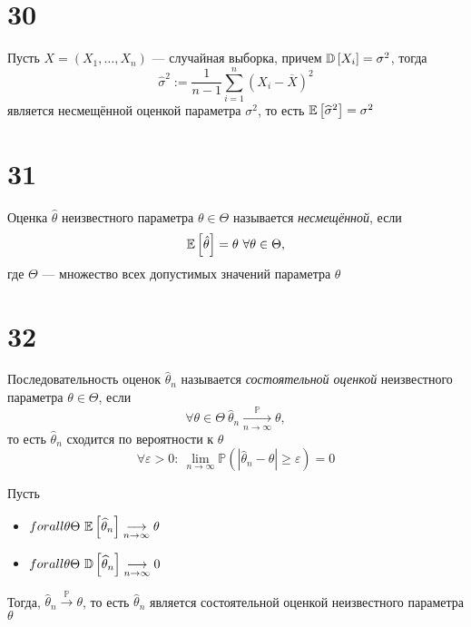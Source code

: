 \documentclass{article}
\begin{document}
\section*{30}
\theorem Пусть $X=(X_1,\ldots,X_n)$ — случайная выборка, причем $\mathbb{D}\left[X_i\right]=\sigma^2$, тогда 
\begin{equation*}
    \widehat{\sigma}^2:=\displaystyle\frac{1}{n-1}\sum_{i=1}^n (X_i-\overline{X})^2
\end{equation*}
является несмещённой оценкой параметра $\sigma^2$, то есть $\mathbb{E}\left[\widehat{\sigma}^2\right]=\sigma^2$

\section*{31}
Оценка $\hat{\theta}$ неизвестного параметра $\theta\in\Theta$ называется \textit{несмещённой}, если 
\begin{equation*}
    \matwait{\hat{\theta}}=\theta\ \forall\theta\in\Theta,
\end{equation*}
где $\Theta$ — множество всех допустимых значений параметра $\theta$

\section*{32}
 Последовательность оценок $\hat{\theta}_n$ называется \textit{состоятельной оценкой} неизвестного параметра $\theta\in\Theta$, если
\begin{equation*}
    \forall \theta\in\Theta\ \hat{\theta}_n\underset{n\to\infty}{\overset{\mathbb{P}}{\longrightarrow}}\theta,
\end{equation*}
то есть $\hat{\theta}_n$ сходится по вероятности к $\theta$
\begin{equation*}
    \forall\varepsilon>0:\ \lim\limits_{n\to\infty}\mathbb{P}(|\hat{\theta}_n-\theta|\geqslant\varepsilon)=0
\end{equation*}


\theorem Пусть 
\begin{itemize}
    \item $forall\theta\Theta\ \matwait{\widehat{\theta}_n}\underset{n\to\infty}{\longrightarrow}\theta$
    \item $forall\theta\Theta\ \dispersia{\widehat{\theta}_n}\underset{n\to\infty}{\longrightarrow}0$
\end{itemize}
Тогда, $\widehat{\theta}_n\overset{\mathbb{P}}{\longrightarrow}\theta$, то есть $\widehat{\theta}_n$ является состоятельной оценкой  неизвестного параметра $\theta$
\end{document}
